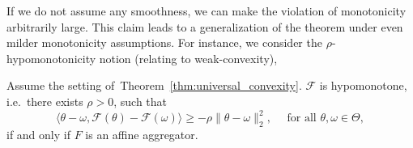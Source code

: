 \documentclass[twoside,11pt]{article}
\newcommand{\F}{\mathcal{F}}
\begin{document}
If we do not assume any smoothness, we can make the violation of monotonicity arbitrarily large. 
This claim leads to a generalization of the theorem under even milder monotonicity assumptions. 
For instance, we consider the $\rho$-hypomonotonicity notion (relating to weak-convexity),
\begin{theorem}\label{thm:universal_hypomonotone}
    Assume the setting of~Theorem~\ref{thm:universal_convexity}.
    $\F$ is hypomonotone, i.e.\ there exists $\rho > 0$, such that
    \begin{equation}\label{eq:hypomonotonicity}
        \langle \theta - \omega, \F(\theta) - \F(\omega) \rangle \geq -\rho \| \theta - \omega \|^2_2, \quad\text{ for all } \theta, \omega \in \Theta,
    \end{equation}
    if and only if $F$ is an affine aggregator.
\end{theorem}
\end{document}
